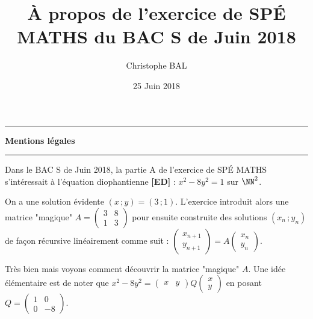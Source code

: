 \documentclass[12pt]{amsart}
\begin{document}
\title{À propos de l'exercice de SPÉ MATHS du BAC S de Juin 2018}
\author{Christophe BAL}
\date{25 Juin 2018}
\maketitle


\begin{center}
	\hrule\vspace{.3em}
	{
		\fontsize{1.35em}{1em}\selectfont
		\textbf{Mentions \og légales \fg}
	}
			
	\vspace{0.45em}
	\doclicenseThis
	\hrule
\end{center}


\bigskip


Dans le BAC S de Juin 2018, la partie A de l'exercice de SPÉ MATHS s'intéressait à l'équation diophantienne \textbf{[ED]} : $x^2 - 8 y^2 = 1$ sur $\NN^2$. 


\medskip

On a une solution évidente $(x \,; y) = (3 \,; 1)$. L'exercice introduit alors une matrice "magique"
$A =
\begin{pmatrix} 
  3 & 8  \\ 
  1 & 3 
\end{pmatrix}$
pour ensuite construite des solutions $(x_n \,; y_n)$ de façon récursive linéairement comme suit :
$\begin{pmatrix} 
  x_{n+1} \\ 
  y_{n+1} 
\end{pmatrix}
=
A
\begin{pmatrix} 
  x_{n} \\ 
  y_{n} 
\end{pmatrix}
$.


\medskip

Très bien mais voyons comment découvrir la matrice "magique" $A$. Une idée élémentaire est de noter que
$x^2 - 8 y^2
=
\begin{pmatrix} 
  x & y 
\end{pmatrix}
Q
\begin{pmatrix} 
  x \\ 
  y 
\end{pmatrix}$
en posant
$Q
=
\begin{pmatrix} 
  1 & 0  \\ 
  0 & -8 
\end{pmatrix}$.


\medskip
\end{document}
